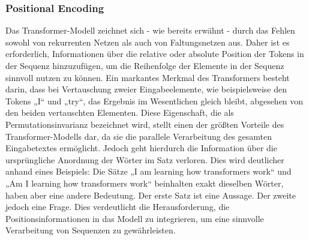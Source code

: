 

\subsubsection*{Positional Encoding}

Das Transformer-Modell zeichnet sich - wie bereits erwähnt - durch das Fehlen sowohl von rekurrenten Netzen als auch von Faltungsnetzen aus. Daher ist es erforderlich, Informationen über die relative oder absolute Position der Tokens in der Sequenz hinzuzufügen, um die Reihenfolge der Elemente in der Sequenz sinnvoll nutzen zu können. Ein markantes Merkmal des Transformers besteht darin, dass bei Vertauschung zweier Eingabeelemente, wie beispielsweise den Tokens „I“ und „try“, das Ergebnis im Wesentlichen gleich bleibt, abgesehen von den beiden vertauschten Elementen. Diese Eigenschaft, die als Permutationsinvarianz bezeichnet wird, stellt einen der größten Vorteile des Transformer-Modells dar, da sie die parallele Verarbeitung des gesamten Eingabetextes ermöglicht. Jedoch geht hierdurch die Information über die ursprüngliche Anordnung der Wörter im Satz verloren. Dies wird deutlicher anhand eines Beispiels: Die Sätze „I am learning how transformers work“ und „Am I learning how transformers work“ beinhalten exakt dieselben Wörter, haben aber eine andere Bedeutung. Der erste Satz ist eine Aussage. Der zweite jedoch eine Frage. Dies verdeutlicht die Herausforderung, die Positionsinformationen in das Modell zu integrieren, um eine sinnvolle Verarbeitung von Sequenzen zu gewährleisten.

